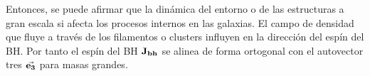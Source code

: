 Entonces, se puede afirmar que la dinámica del entorno o de las  estructuras a gran escala si afecta los procesos internos en las galaxias. El campo de densidad que fluye a través de los filamentos o clusters influyen en la dirección del espín del BH. Por tanto el espín del BH ${\bf{J_{bh}}}$ se alinea de forma ortogonal con el autovector tres $\vec{\bf{e}_3}$ para masas grandes. 
%

\begin{figure} 
\centering 
{}\vspace{0mm} 
 \vspace{0mm} 
\vspace{0.1mm} 

\end{figure}
